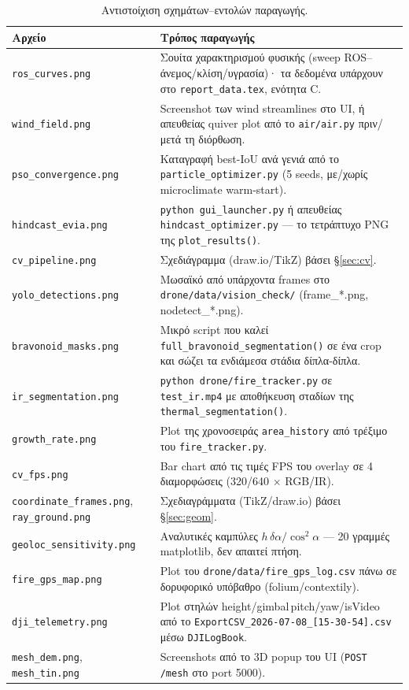 \documentclass[11pt]{article}
\newcommand{\code}[1]{\texttt{#1}}
\begin{document}
\begin{table}[htbp]
\centering\small
\begin{tabular}{@{}lp{9.2cm}@{}}
\toprule
\textbf{Αρχείο} & \textbf{Τρόπος παραγωγής} \\
\midrule
\code{ros\_curves.png} & Σουίτα χαρακτηρισμού φυσικής (sweep ROS--άνεμος/κλίση/υγρασία)· τα δεδομένα υπάρχουν στο \code{report\_data.tex}, ενότητα C. \\
\code{wind\_field.png} & Screenshot των wind streamlines στο UI, ή απευθείας quiver plot από το \code{air/air.py} πριν/μετά τη διόρθωση. \\
\code{pso\_convergence.png} & Καταγραφή best-IoU ανά γενιά από το \code{particle\_optimizer.py} (5 seeds, με/χωρίς microclimate warm-start). \\
\code{hindcast\_evia.png} & \code{python gui\_launcher.py} ή απευθείας \code{hindcast\_optimizer.py} --- το τετράπτυχο PNG της \code{plot\_results()}. \\
\code{cv\_pipeline.png} & Σχεδιάγραμμα (draw.io/TikZ) βάσει \S\ref{sec:cv}. \\
\code{yolo\_detections.png} & Μωσαϊκό από υπάρχοντα frames στο \code{drone/data/vision\_check/} (frame\_*.png, nodetect\_*.png). \\
\code{bravonoid\_masks.png} & Μικρό script που καλεί \code{full\_bravonoid\_segmentation()} σε ένα crop και σώζει τα ενδιάμεσα στάδια δίπλα-δίπλα. \\
\code{ir\_segmentation.png} & \code{python drone/fire\_tracker.py} σε \code{test\_ir.mp4} με αποθήκευση σταδίων της \code{thermal\_segmentation()}. \\
\code{growth\_rate.png} & Plot της χρονοσειράς \code{area\_history} από τρέξιμο του \code{fire\_tracker.py}. \\
\code{cv\_fps.png} & Bar chart από τις τιμές FPS του overlay σε 4 διαμορφώσεις (320/640 $\times$ RGB/IR). \\
\code{coordinate\_frames.png}, \code{ray\_ground.png} & Σχεδιαγράμματα (TikZ/draw.io) βάσει \S\ref{sec:geom}. \\
\code{geoloc\_sensitivity.png} & Αναλυτικές καμπύλες $h\,\delta\alpha/\cos^2\alpha$ --- 20 γραμμές matplotlib, δεν απαιτεί πτήση. \\
\code{fire\_gps\_map.png} & Plot του \code{drone/data/fire\_gps\_log.csv} πάνω σε δορυφορικό υπόβαθρο (folium/contextily). \\
\code{dji\_telemetry.png} & Plot στηλών height/gimbal\,pitch/yaw/isVideo από το \code{ExportCSV\_2026-07-08\_[15-30-54].csv} μέσω \code{DJILogBook}. \\
\code{mesh\_dem.png}, \code{mesh\_tin.png} & Screenshots από το 3D popup του UI (\code{POST /mesh} στο port 5000). \\
\bottomrule
\end{tabular}
\caption{Αντιστοίχιση σχημάτων--εντολών παραγωγής.}
\end{table}
\end{document}
